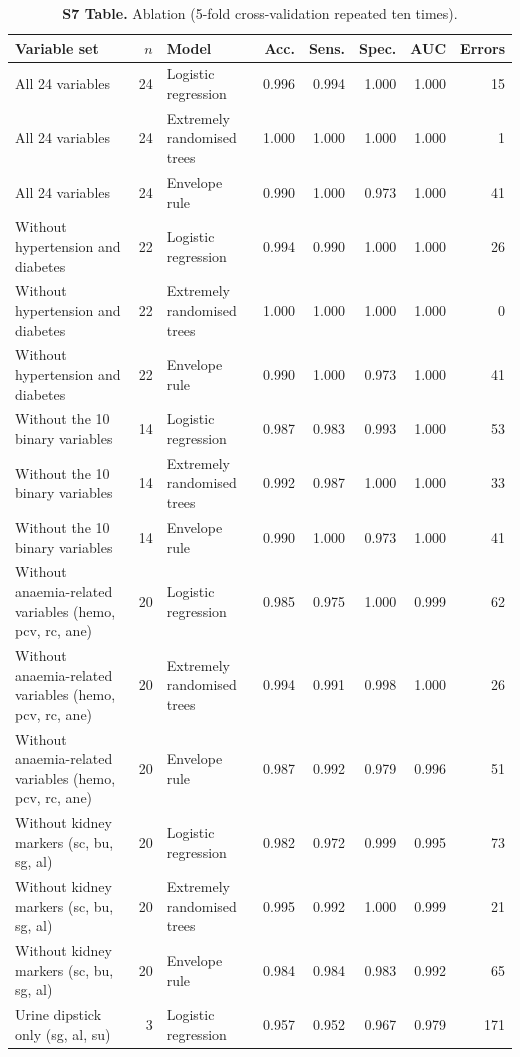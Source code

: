 \begin{table}[!ht]\centering\small
\caption{{\bf S7 Table.} Ablation (5-fold cross-validation repeated ten times).}
\begin{tabular}{p{4.6cm}rlrrrrr}\toprule
Variable set & $n$ & Model & Acc. & Sens. & Spec. & AUC & Errors\\\midrule
All 24 variables & 24 & Logistic regression & 0.996 & 0.994 & 1.000 & 1.000 & 15\\
All 24 variables & 24 & Extremely randomised trees & 1.000 & 1.000 & 1.000 & 1.000 & 1\\
All 24 variables & 24 & Envelope rule & 0.990 & 1.000 & 0.973 & 1.000 & 41\\
Without hypertension and diabetes & 22 & Logistic regression & 0.994 & 0.990 & 1.000 & 1.000 & 26\\
Without hypertension and diabetes & 22 & Extremely randomised trees & 1.000 & 1.000 & 1.000 & 1.000 & 0\\
Without hypertension and diabetes & 22 & Envelope rule & 0.990 & 1.000 & 0.973 & 1.000 & 41\\
Without the 10 binary variables & 14 & Logistic regression & 0.987 & 0.983 & 0.993 & 1.000 & 53\\
Without the 10 binary variables & 14 & Extremely randomised trees & 0.992 & 0.987 & 1.000 & 1.000 & 33\\
Without the 10 binary variables & 14 & Envelope rule & 0.990 & 1.000 & 0.973 & 1.000 & 41\\
Without anaemia-related variables (hemo, pcv, rc, ane) & 20 & Logistic regression & 0.985 & 0.975 & 1.000 & 0.999 & 62\\
Without anaemia-related variables (hemo, pcv, rc, ane) & 20 & Extremely randomised trees & 0.994 & 0.991 & 0.998 & 1.000 & 26\\
Without anaemia-related variables (hemo, pcv, rc, ane) & 20 & Envelope rule & 0.987 & 0.992 & 0.979 & 0.996 & 51\\
Without kidney markers (sc, bu, sg, al) & 20 & Logistic regression & 0.982 & 0.972 & 0.999 & 0.995 & 73\\
Without kidney markers (sc, bu, sg, al) & 20 & Extremely randomised trees & 0.995 & 0.992 & 1.000 & 0.999 & 21\\
Without kidney markers (sc, bu, sg, al) & 20 & Envelope rule & 0.984 & 0.984 & 0.983 & 0.992 & 65\\
Urine dipstick only (sg, al, su) & 3 & Logistic regression & 0.957 & 0.952 & 0.967 & 0.979 & 171\\

\end{tabular}
\end{table}
